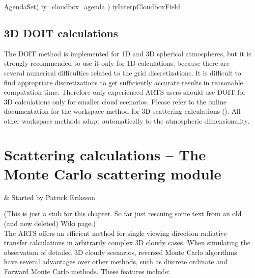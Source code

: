 \begin{code}
AgendaSet( iy_cloudbox_agenda ){
    iyInterpCloudboxField
}
\end{code}

\section{3D DOIT calculations}

The DOIT method is implemented for 1D and 3D spherical atmospheres, but it is
strongly recommended to use it only for 1D calculations, because there
are several numerical difficulties related to the grid
discretizations. It is difficult to find appropriate discretizations
to get sufficiently accurate results in reasonable computation
time. Therefore only experienced ARTS users should use DOIT for 3D
calculations only for smaller cloud scenarios. Please refer to the online
documentation for the workspace method for  3D scattering calculations
(). All other workspace
methods adapt automatically to the atmospheric dimensionality.





\chapter{Scattering calculations -- The Monte Carlo scattering module}
 \label{sec:scattering:mc}

 & Started by Patrick Eriksson\\ 
\stophistory

(This is just a stub for this chapter. So far just rescuing some text from an
old (and now deleted) Wiki page.)\\

\noindent
The ARTS  offers an efficient method
for single viewing direction radiative transfer calculations in arbitrarily
complex 3D cloudy cases. When simulating the observation of detailed 3D cloudy
scenarios, reversed Monte Carlo algorithms have several advantages over other
methods, such as discrete ordinate and Forward Monte Carlo methods. These
features include:

